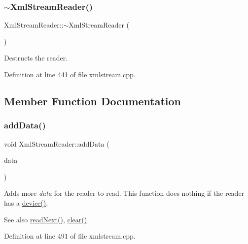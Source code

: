 \subsubsection{\texorpdfstring{$\sim$\+Xml\+Stream\+Reader()}{~XmlStreamReader()}}
{\footnotesize\ttfamily Xml\+Stream\+Reader\+::$\sim$\+Xml\+Stream\+Reader (\begin{DoxyParamCaption}{ }\end{DoxyParamCaption})}

Destructs the reader. 

Definition at line 441 of file xmlstream.\+cpp.



\subsection{Member Function Documentation}
\mbox{\label{class_xml_stream_reader_add6baa0f8790fc528c1fa6e05755f96b}} 
\subsubsection{\texorpdfstring{add\+Data()}{addData()}\hspace{0.1cm}{\footnotesize\ttfamily [1/3]}}
{\footnotesize\ttfamily void Xml\+Stream\+Reader\+::add\+Data (\begin{DoxyParamCaption}\item[{const Q\+Byte\+Array \&}]{data }\end{DoxyParamCaption})}

Adds more {\itshape data} for the reader to read. This function does nothing if the reader has a \hyperlink{class_xml_stream_reader_aa2a751d1b36fac13138b2f370683dfe7}{device()}.

\begin{DoxySeeAlso}{See also}
\hyperlink{class_xml_stream_reader_adb18e6f9842e9b470cde16385732ad84}{read\+Next()}, \hyperlink{class_xml_stream_reader_a2a67f5a1fff83d33214ccc9ec9494ca0}{clear()} 
\end{DoxySeeAlso}


Definition at line 491 of file xmlstream.\+cpp.

\mbox{\label{class_xml_stream_reader_ac998bbe2fc600172e2d780a58708f358}} 
